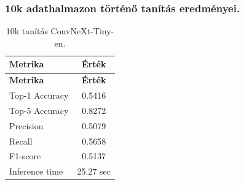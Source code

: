 \subsubsection{10k adathalmazon történő tanítás eredményei.}
  \begin{center}
    \begin{longtable}{l c}
    \caption{10k tanítás ConvNeXt-Tiny-en.} \label{tab:phase03_ConvNeXt-Tiny_10k} \\
    \toprule
    \textbf{Metrika} & \textbf{Érték} \\
    \midrule
    \endfirsthead
    \toprule
    \textbf{Metrika} & \textbf{Érték} \\
    \midrule
    \endhead
    Top-1 Accuracy & 0.5416 \\
    Top-5 Accuracy & 0.8272 \\
    Precision      & 0.5079 \\
    Recall         & 0.5658 \\
    F1-score       & 0.5137 \\
    Inference time & 25.27 sec \\
    \bottomrule
    \end{longtable}
  \end{center}

